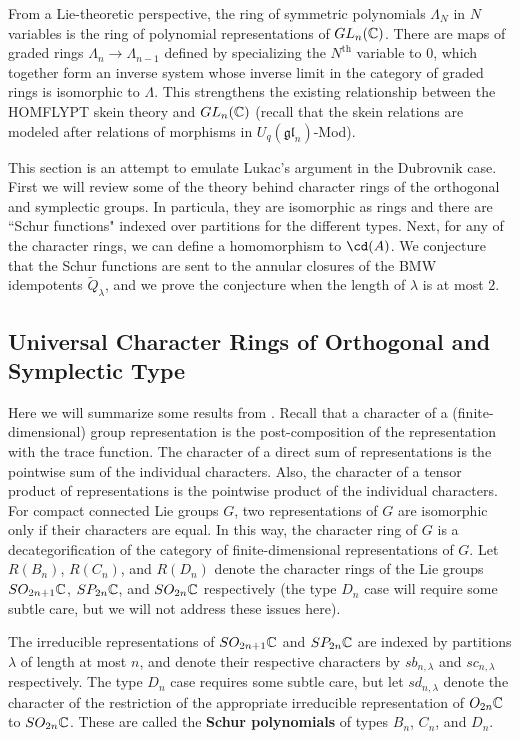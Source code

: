 From a Lie-theoretic perspective, the ring of symmetric polynomials $\Lambda_N$ in $N$ variables is the ring of polynomial representations of $GL_n(\mathbb{C})$. There are maps of graded rings $\Lambda_n \to \Lambda_{n-1}$ defined by specializing the $N^{\mathrm{th}}$ variable to $0$, which together form an inverse system whose inverse limit in the category of graded rings is isomorphic to $\Lambda$. This strengthens the existing relationship between the HOMFLYPT skein theory and $GL_n(\mathbb{C})$ (recall that the skein relations are modeled after relations of morphisms in $U_q(\mathfrak{gl}_n)$-Mod). 

This section is an attempt to emulate Lukac's argument in the Dubrovnik case. First we will review some of the theory behind character rings of the orthogonal and symplectic groups. In particula, they are isomorphic as rings and there are ``Schur functions" indexed over partitions for the different types. Next, for any of the character rings, we can define a homomorphism to $\cd(A)$. We conjecture that the Schur functions are sent to the annular closures of the BMW idempotents $\widetilde{Q}_\lambda$, and we prove the conjecture when the length of $\lambda$ is at most $2$.








\subsection{Universal Character Rings of Orthogonal and Symplectic Type}

Here we will summarize some results from \cite{KT87}. Recall that a character of a (finite-dimensional) group representation is the post-composition of the representation with the trace function. The character of a direct sum of representations is the pointwise sum of the individual characters. Also, the character of a tensor product of representations is the pointwise product of the individual characters. For compact connected Lie groups $G$, two representations of $G$ are isomorphic only if their characters are equal. In this way, the character ring of $G$ is a decategorification of the category of finite-dimensional representations of $G$. Let $R(B_n)$, $R(C_n)$, and $R(D_n)$ denote the character rings of the Lie groups $SO_{2n+1}\mathbb{C}$, $SP_{2n}\mathbb{C}$, and $SO_{2n}\mathbb{C}$ respectively (the type $D_n$ case will require some subtle care, but we will not address these issues here). 

The irreducible representations of $SO_{2n+1}\mathbb{C}$ and $SP_{2n}\mathbb{C}$ are indexed by partitions $\lambda$ of length at most $n$, and denote their respective characters by $sb_{n, \lambda}$ and $sc_{n, \lambda}$ respectively. The type $D_n$ case requires some subtle care, but let $sd_{n, \lambda}$ denote the character of the restriction of the appropriate irreducible representation of $O_{2n}\mathbb{C}$ to $SO_{2n}\mathbb{C}$. These are called the \textbf{Schur polynomials} of types $B_n$, $C_n$, and $D_n$.

